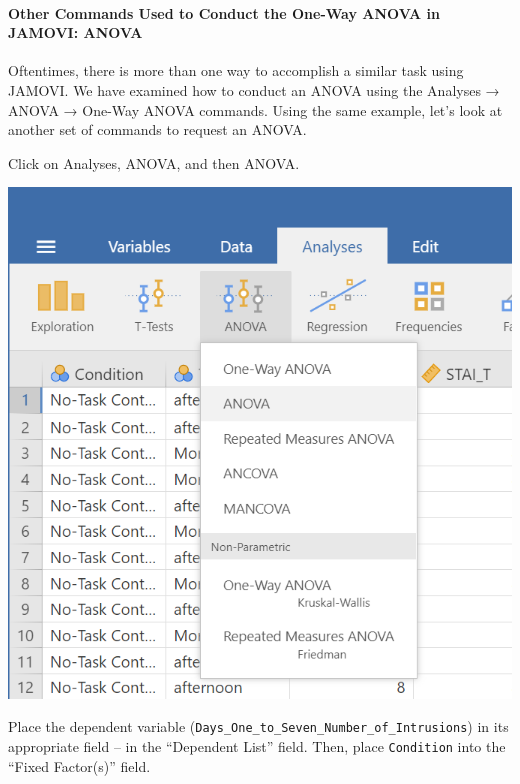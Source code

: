 \documentclass[
]{book}
\begin{document}
\hypertarget{other-commands-used-to-conduct-the-one-way-anova-in-jamovi-anova}{%
\paragraph{Other Commands Used to Conduct the One-Way ANOVA in JAMOVI: ANOVA}\label{other-commands-used-to-conduct-the-one-way-anova-in-jamovi-anova}}

Oftentimes, there is more than one way to accomplish a similar task using JAMOVI. We have examined how to conduct an ANOVA using the {Analyses} → {ANOVA} → {One-Way ANOVA} commands. Using the same example, let's look at another set of commands to request an ANOVA.

Click on {Analyses}, { ANOVA}, and then {ANOVA}.

\includegraphics{img/ANOVACommands.png}

Place the dependent variable (\texttt{Days\_One\_to\_Seven\_Number\_of\_Intrusions}) in its appropriate field -- in the ``Dependent List'' field. Then, place \texttt{Condition} into the ``Fixed Factor(s)'' field.
\end{document}
